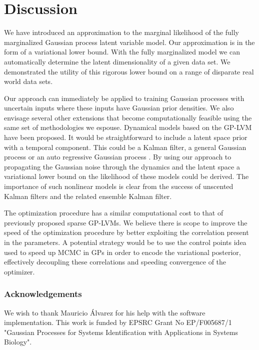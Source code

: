\documentclass[twoside,times]{article}
\begin{document}

\vspace{-2mm}
\section{Discussion}
\vspace{-3mm}

We have introduced an approximation to the marginal likelihood of the
fully marginalized Gaussian process latent variable model. Our
approximation is in the form of a variational lower bound. With the
fully marginalized model we can automatically determine the latent
dimensionality of a given data set. We demonstrated the utility of
this rigorous lower bound on a range of disparate real world data
sets.

Our approach can immediately be applied to training Gaussian processes
with uncertain inputs where these inputs have Gaussian prior
densities. We also envisage several other extensions that
become computationally feasible using the same set of methodologies we
espouse. Dynamical models based on the GP-LVM have been proposed. It
would be straightforward to include a latent space prior with a
temporal component. This could be a Kalman filter, a general Gaussian
process \citep{Lawrence:hgplvm07} or an auto regressive Gaussian
process \citep{Wang:gpdm05}. By using our approach to propagating the
Gaussian noise through the dynamics and the latent space a variational
lower bound on the likelihood of these models could be derived. The
importance of such nonlinear models is clear from the success of
unscented Kalman filters and the related ensemble Kalman filter.

The optimization procedure has a similar computational cost to that of
previously proposed sparse GP-LVMs. We believe there is scope to
improve the speed of the optimization procedure by better exploiting
the correlation present in the parameters. A potential strategy would
be to use the control points idea used to speed up MCMC in GPs 
\citep{Titsias:efficient08} in order to encode the 
variational posterior, effectively decoupling these correlations and
speeding convergence of the optimizer.

\subsubsection*{Acknowledgements}
\vspace{-2mm}
We wish to thank Mauricio \'Alvarez for his help with the software implementation.
This work is funded by EPSRC Grant No EP/F005687/1
"Gaussian Processes for Systems Identification with
Applications in Systems Biology".

\small{


}
\end{document}
